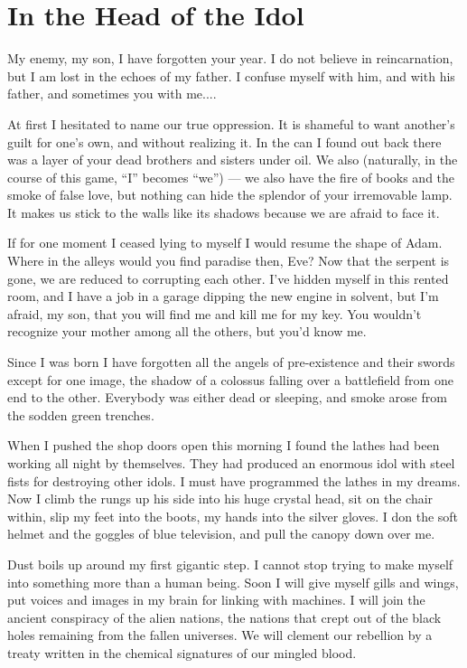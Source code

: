\documentclass[english,11pt,letterpaper,onecolumn]{scrbook}
\begin{document}
\newpage
\section{In the Head of the Idol}
	My enemy, my son, I have forgotten your year.  I do not believe in reincarnation, but I am lost in the echoes of my father.  I confuse myself with him, and with his father, and sometimes you with me....
	
	At first I hesitated to name our true oppression.  It is shameful to want another's guilt for one's own, and without realizing it.  In the can I found out back there was a layer of your dead brothers and sisters under oil.  We also (naturally, in the course of this game, ``I'' becomes ``we'') --- we also have the fire of books and the smoke of false love, but nothing can hide the splendor of your irremovable lamp.  It makes us stick to the walls like its shadows because we are afraid to face it.
	
	If for one moment I ceased lying to myself I would resume the shape of Adam.  Where in the alleys would you find paradise then, Eve?  Now that the serpent is gone, we are reduced to corrupting each other.  I've hidden myself in this rented room, and I have a job in a garage dipping the new engine in solvent, but I'm afraid, my son, that you will find me and kill me for my key.  You wouldn't recognize your mother among all the others, but you'd know me.

	Since I was born I have forgotten all the angels of pre-existence and their swords except for one image, the shadow of a colossus falling over a battlefield from one end to the other.  Everybody was either dead or sleeping, and smoke arose from the sodden green trenches.

	When I pushed the shop doors open this morning I found the lathes had been working all night by themselves.  They had produced an enormous idol with steel fists for destroying other idols.  I must have programmed the lathes in my dreams.  Now I climb the rungs up his side into his huge crystal head, sit on the chair within, slip my feet into the boots, my hands into the silver gloves.  I don the soft helmet and the goggles of blue television, and pull the canopy down over me.

	Dust boils up around my first gigantic step.  I cannot stop trying to make myself into something more than a human being.  Soon I will give myself gills and wings, put voices and images in my brain for linking with machines.  I will join the ancient conspiracy of the alien nations, the nations that crept out of the black holes remaining from the fallen universes.  We will clement our rebellion by a treaty written in the chemical signatures of our mingled blood.
\end{document}
